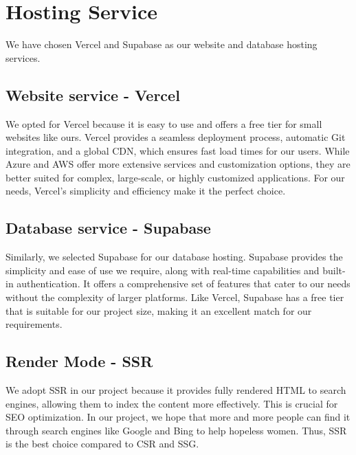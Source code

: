 

\section{Hosting Service}
We have chosen Vercel and Supabase as our website and database hosting services.

\subsection{Website service - Vercel}
We opted for Vercel because it is easy to use and offers a free tier for small websites like ours. Vercel provides a seamless deployment process, automatic Git integration, and a global CDN, which ensures fast load times for our users. While Azure and AWS offer more extensive services and customization options, they are better suited for complex, large-scale, or highly customized applications. For our needs, Vercel's simplicity and efficiency make it the perfect choice.

\subsection{Database service - Supabase}
Similarly, we selected Supabase for our database hosting. Supabase provides the simplicity and ease of use we require, along with real-time capabilities and built-in authentication. It offers a comprehensive set of features that cater to our needs without the complexity of larger platforms. Like Vercel, Supabase has a free tier that is suitable for our project size, making it an excellent match for our requirements.

\subsection{Render Mode - SSR }
We adopt SSR in our project because it provides fully rendered HTML to search engines, allowing them to index the content more effectively. This is crucial for SEO optimization. In our project, we hope that more and more people can find it through search engines like Google and Bing to help hopeless women. Thus, SSR is the best choice compared to CSR and SSG.